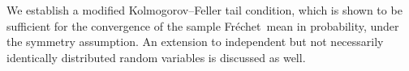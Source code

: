 \documentclass[preprint]{imsart}
\def\Frechet{Fr\'{e}chet}
\theoremstyle{plain}
\theoremstyle{remark}
\begin{document}
We establish a modified Kolmogorov--Feller tail condition, which is shown to be sufficient for the convergence of the sample \Frechet\ mean in probability, under the symmetry assumption.  An extension to independent but not necessarily identically distributed random variables is discussed as well. 

  






\end{document}
